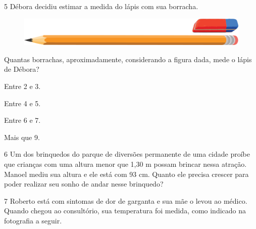 

\num{5} Débora decidiu estimar a medida do lápis com sua borracha.

\begin{figure}[htpb!]
\centering
\includegraphics[width=.5\textwidth]{./media/image46.png}
\end{figure}

Quantas borrachas, aproximadamente, considerando a figura dada, mede o lápis de Débora?

\begin{minipage}{.5\textwidth}
\begin{escolha}
\item
  Entre 2 e 3.
\item
  Entre 4 e 5.
\item
  Entre 6 e 7.
\item
  Mais que 9.
\end{escolha}
\end{minipage}


\num{6} Um dos brinquedos do parque de diversões permanente de uma cidade proíbe
que crianças com uma altura menor que 1,30 m possam brincar nessa
atração. Manoel mediu sua altura e ele está com 93 cm. Quanto ele
precisa crescer para poder realizar seu sonho de andar nesse brinquedo?


\num{7} Roberto está com sintomas de dor de garganta e sua mãe o levou ao
médico. Quando chegou ao consultório, sua temperatura foi medida, como indicado na fotografia a seguir.

